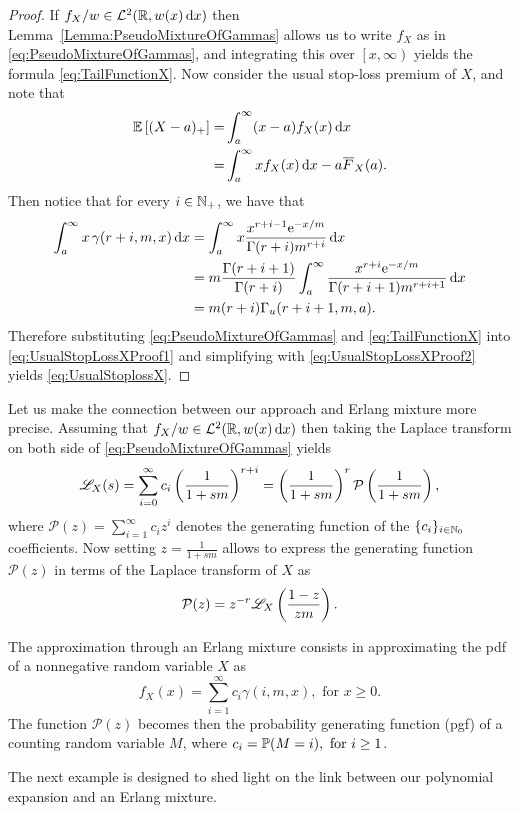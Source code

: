 \begin{proof}
If $f_{X}/w\in \mathcal{L}^2(\mathbb{R}, w(x) \mathop{}\!\mathrm{d} x)$ then Lemma~\ref{Lemma:PseudoMixtureOfGammas} allows us to write $f_X$ as in \eqref{eq:PseudoMixtureOfGammas}, and integrating this over $\left[x,\infty\right)$ yields the formula \eqref{eq:TailFunctionX}.
Now consider the usual stop-loss premium of $X$, and note that
\begin{align}
\Exp\left[(X-a)_+\right]=&\int_{a}^{\infty}(x-a)f_{X}(x)\dd x \nonumber\\
=&\int_{a}^{\infty}xf_{X}(x)\dd x-a\Ftail_{X}(a).\label{eq:UsualStopLossXProof1}
\end{align}
Then notice that for every $i \in \mathbb{N}_+$, we have that
\begin{align}
\int_{a}^{\infty} x \, \gamma(r+i, m, x)\mathop{}\!\mathrm{d} x
&= \int_{a}^{\infty}x\frac{x^{r+i-1} \mathrm{e}^{-x/m}}{\Gamma(r+i)m^{r+i}}\mathop{}\!\mathrm{d} x\nonumber\\
&= m\frac{\Gamma(r+i+1)}{\Gamma(r+i)}\int_{a}^{\infty}\frac{x^{r+i} \mathrm{e}^{-x/m}}{\Gamma(r+i+1)m^{r+i+1}}\mathop{}\!\mathrm{d} x\nonumber\\
&= m (r+i) \Gamma_{u}(r+i+1,m,a).\label{eq:UsualStopLossXProof2}
\end{align}
Therefore substituting \eqref{eq:PseudoMixtureOfGammas} and \eqref{eq:TailFunctionX} into \eqref{eq:UsualStopLossXProof1} and simplifying with \eqref{eq:UsualStopLossXProof2} yields \eqref{eq:UsualStoplossX}.
\end{proof}

Let us make the connection between our approach and Erlang mixture more precise. Assuming that $f_{X}/w\in\mathcal{L}^2(\mathbb{R}, w(x) \mathop{}\!\mathrm{d} x)$ then taking the Laplace transform on both side of \eqref{eq:PseudoMixtureOfGammas} yields
\begin{equation*}
\mathscr{L}_{X}(s)=\sum_{i=0}^{\infty} c_i \left(\frac{1}{1+sm}\right)^{r+i}
=\left(\frac{1}{1+sm}\right)^{r}\mathcal{P}\left(\frac{1}{1+sm}\right),\label{eq:PseudoErlangMixtureLaplaceTransform}
\end{equation*}
where $\mathcal{P}(z)=\sum_{i=1}^{\infty}c_i z^{i}$ denotes the generating function of the $\{c_i\}_{i\in\mathbb{N}_0}$ coefficients. Now setting $z=\frac{1}{1+sm}$ allows to express the generating function $\mathcal{P}(z)$ in terms of the Laplace transform of $X$ as
\begin{equation*}\label{eq:GeneratingFunctionPi}
\mathcal{P}(z)=z^{-r}\mathscr{L}_{X}\left(\frac{1-z}{zm}\right).
\end{equation*}

\begin{remark}
The approximation through an Erlang mixture consists in approximating the pdf of a nonnegative random variable $X$ as
\begin{equation*}\label{eq:ErlangMixtureRepresentation}
f_X(x)=\sum_{i=1}^{\infty}c_i\gamma(i,m,x),\text{ for }x\geq0.
\end{equation*}
The function $\mathcal{P}(z)$ becomes then the probability generating function (pgf) of a counting random variable $M$, where $c_i=\operatorname{{\mathbb P}}(M=i),\text{ for }i\geq1$.
\remQED
\end{remark}
The next example is designed to shed light on the link between our polynomial expansion and an Erlang mixture.

